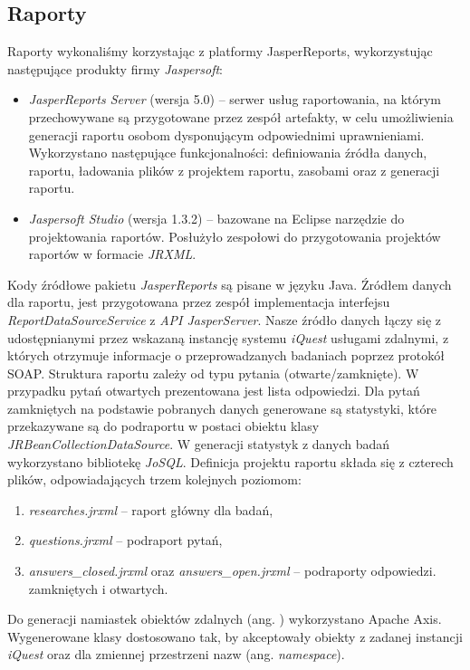 \subsection{Raporty}
Raporty wykonaliśmy korzystając z platformy JasperReports, wykorzystując następujące produkty firmy \emph{Jaspersoft}:

\begin{itemize}
\item \emph{JasperReports Server} (wersja 5.0) -- serwer usług raportowania, na którym przechowywane są przygotowane przez zespół artefakty, w celu umożliwienia generacji raportu osobom dysponującym odpowiednimi uprawnieniami. Wykorzystano następujące funkcjonalności: definiowania źródła danych, raportu, ładowania plików z projektem raportu, zasobami oraz z generacji raportu.
\item \emph{Jaspersoft Studio} (wersja 1.3.2) -- bazowane na Eclipse narzędzie do projektowania raportów. Posłużyło zespołowi do przygotowania projektów raportów w formacie \emph{JRXML}.
\end{itemize}

Kody źródłowe pakietu \emph{JasperReports} są pisane w języku Java. Źródłem danych dla raportu, jest przygotowana przez zespół implementacja interfejsu \emph{ReportDataSourceService} z \emph{API JasperServer}. Nasze źródło danych łączy się z udostępnianymi przez wskazaną instancję systemu \emph{iQuest} usługami zdalnymi, z których otrzymuje informacje o przeprowadzanych badaniach poprzez protokół SOAP. Struktura raportu zależy od typu pytania (otwarte/zamknięte). W przypadku pytań otwartych prezentowana jest lista odpowiedzi. Dla pytań zamkniętych na podstawie pobranych danych generowane są statystyki, które przekazywane są do podraportu w postaci obiektu klasy \emph{JRBeanCollectionDataSource}. W generacji statystyk z danych badań wykorzystano bibliotekę \emph{JoSQL}. Definicja projektu raportu składa się z czterech plików, odpowiadających trzem kolejnych poziomom:
\begin{enumerate}
\item \emph{researches.jrxml} -- raport główny dla badań,
\item \emph{questions.jrxml} -- podraport pytań,
\item \emph{answers\_closed.jrxml} oraz \emph{answers\_open.jrxml} -- podraporty odpowiedzi. zamkniętych i otwartych.
\end{enumerate}
Do generacji namiastek obiektów zdalnych (ang. ) wykorzystano Apache Axis. Wygenerowane klasy dostosowano tak, by akceptowały obiekty z zadanej instancji \emph{iQuest} oraz dla zmiennej przestrzeni nazw (ang. \emph{namespace}).\\

